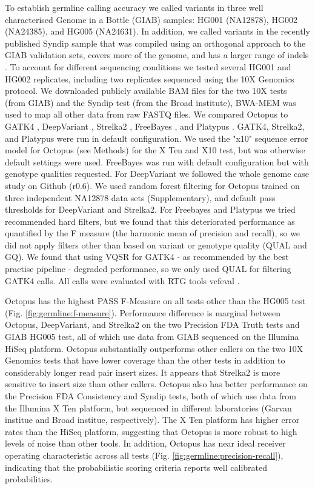 \documentclass[notitlepage, twocolumn]{article}
\begin{document}
To establish germline calling accuracy we called variants in three well characterised Genome in a Bottle (GIAB) \cite{RN153} samples: HG001 (NA12878), HG002 (NA24385), and HG005 (NA24631). In addition, we called variants in the recently published Syndip sample that was compiled using an orthogonal approach to the GIAB validation sets, covers more of the genome, and has a larger range of indels \cite{RN605}. To account for different sequencing conditions we tested several HG001 and HG002 replicates, including two replicates sequenced using the 10X Genomics protocol. We downloaded publicly available BAM files for the two 10X tests (from GIAB) and the Syndip test (from the Broad institute), BWA-MEM \cite{RN539} was used to map all other data from raw FASTQ files. We compared Octopus to GATK4 \cite{RN598}, DeepVariant \cite{RN562}, Strelka2 \cite{RN604}, FreeBayes \cite{RN538}, and Platypus \cite{RN5}. GATK4, Strelka2, and Platypus were run in default configuration. We used the "x10" sequence error model for Octopus (see Methods) for the X Ten and X10 test, but was otherwise default settings were used. FreeBayes was run with default configuration but with genotype qualities requested. For DeepVariant we followed the whole genome case study on Github (r0.6). We used random forest filtering for Octopus trained on three independent NA12878 data sets (Supplementary), and default pass thresholds for DeepVariant and Strelka2. For Freebayes and Platypus we tried recommended hard filters, but we found that this deteriorated performance as quantified by the F measure (the harmonic mean of precision and recall), so we did not apply filters other than based on variant or genotype quality (QUAL and GQ). We found that using VQSR for GATK4 - as recommended by the best practise pipeline - degraded performance, so we only used QUAL for filtering GATK4 calls. All calls were evaluated with RTG tools vcfeval \cite{RN169}.

Octopus has the highest PASS F-Measure on all tests other than the HG005 test (Fig. \ref{fig:germline:f-measure}). Performance difference is marginal between Octopus, DeepVariant, and Strelka2 on the two Precision FDA Truth tests and GIAB HG005 test, all of which use data from GIAB sequenced on the Illumina HiSeq platform. Octopus substantially outperforms other callers on the two 10X Genomics tests that have lower coverage than the other tests in addition to considerably longer read pair insert sizes. It appears that Strelka2 is more sensitive to insert size than other callers. Octopus also has better performance on the Precision FDA Consistency and Syndip tests, both of which use data from the Illumina X Ten platform, but sequenced in different laboratories (Garvan institue and Broad institue, respectively). The X Ten platform has higher error rates than the HiSeq platform, suggesting that Octopus is more robust to high levels of noise than other tools. In addition, Octopus has near ideal receiver operating characteristic across all tests (Fig. \ref{fig:germline:precision-recall}), indicating that the probabilistic scoring criteria reports well calibrated probabilities.
\end{document}
